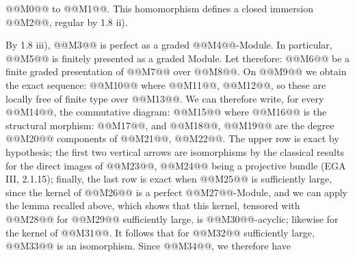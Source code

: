 @@M0@@ to @@M1@@. This homomorphism defines a closed immersion @@M2@@, regular by 1.8 ii).

By 1.8 iii), @@M3@@ is perfect as a graded @@M4@@-Module. In particular, @@M5@@ is finitely presented as a graded Module. Let therefore:
@@M6@@
be a finite graded presentation of @@M7@@ over @@M8@@. On @@M9@@ we obtain the exact sequence:
@@M10@@
where @@M11@@, @@M12@@, so these are locally free of finite type over @@M13@@. We can therefore write, for every @@M14@@, the commutative diagram:
@@M15@@
where @@M16@@ is the structural morphism: @@M17@@, and @@M18@@, @@M19@@ are the degree @@M20@@ components of @@M21@@, @@M22@@. The upper row is exact by hypothesis; the first two vertical arrows are isomorphisms by the classical results for the direct images of @@M23@@, @@M24@@ being a projective bundle (EGA III, 2.1.15); finally, the last row is exact when @@M25@@ is sufficiently large, since the kernel of @@M26@@ is a perfect @@M27@@-Module, and we can apply the lemma recalled above, which shows that this kernel, tensored with @@M28@@ for @@M29@@ sufficiently large, is @@M30@@-acyclic; likewise for the kernel of @@M31@@. It follows that for @@M32@@ sufficiently large, @@M33@@ is an isomorphism. Since @@M34@@, we therefore have
